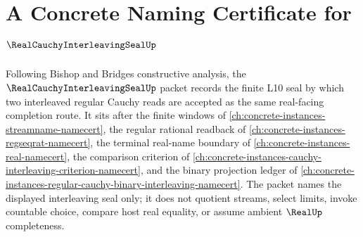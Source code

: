\chapter{A Concrete Naming Certificate for $\RealCauchyInterleavingSealUp$}
\label{ch:concrete-instances-real-cauchy-interleaving-seal-namecert}

Following Bishop and Bridges constructive analysis, the $\RealCauchyInterleavingSealUp$ packet records the finite L10 seal by which two interleaved regular Cauchy reads are accepted as the same real-facing completion route. It sits after the finite windows of \autoref{ch:concrete-instances-streamname-namecert}, the regular rational readback of \autoref{ch:concrete-instances-regseqrat-namecert}, the terminal real-name boundary of \autoref{ch:concrete-instances-real-namecert}, the comparison criterion of \autoref{ch:concrete-instances-cauchy-interleaving-criterion-namecert}, and the binary projection ledger of \autoref{ch:concrete-instances-regular-cauchy-binary-interleaving-namecert}. The packet names the displayed interleaving seal only; it does not quotient streams, select limits, invoke countable choice, compare host real equality, or assume ambient $\RealUp$ completeness.


